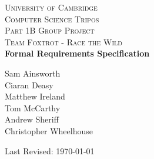 \begin{titlepage}
\begin{center}


\textsc{\LARGE University of Cambridge}\\[3.5cm]

\textsc{\Large Computer Science Tripos \\[2mm] Part 1B Group Project}\\[0.4cm]
\textsc{\Large Team Foxtrot - Race the Wild}\\[2cm]


{ \huge \bfseries \vspace{3.5mm} Formal Requirements Specification }\\[2cm]


\begin{center}
\large
Sam Ainsworth\\
Ciaran Deasy\\
Matthew Ireland\\
Tom McCarthy\\
Andrew Sheriff\\
Christopher Wheelhouse\\
\end{center}

\vfill

{\large Last Revised: \today}
\end{center}
\end{titlepage}
